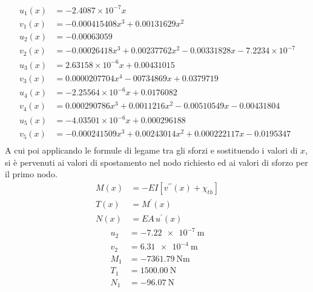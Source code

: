 {\footnotesize{
\begin{align*}
     u_1(x) &= -2.4087\times10^{-7}x\\
     v_1(x) &= -0.000415408 x^3 + 0.00131629 x^2 \\
     u_2(x) &= -0.00063059\\
     v_2(x) &= -0.00026418 x^3 +0.00237762 x^2-0.00331828 x-7.2234\times10^{-7}\\
     u_3(x) &= 2.63158 \times10^{-6}x +0.00431015\\
     v_3(x) &= 0.0000207704 x^4 -00734869x + 0.0379719\\
     u_4(x) &= -2.25564\times10^{-6} x+0.0176082\\
     v_4(x) &= 0.000290786 x^3+0.0011216 x^2-0.00510549 x-0.00431804\\
     u_5(x) &= -4.03501\times10^{-6} x+0.000296188\\
     v_5(x) &= -0.000241509 x^3+0.00243014 x^2 +0.000222117 x-0.0195347\\
\end{align*}}}
A cui poi applicando le formule di legame tra gli sforzi e sostituendo i valori di $x$, si è pervenuti ai valori di spostamento nel nodo richiesto ed ai valori di sforzo per il primo nodo. 
\begin{align*}
    M(x) &= -EI \left[v^{\prime\prime}(x) + \chi_{th}\right] \\
    T(x) &= M^\prime(x) \\
    N(x) &= EA \, u^\prime (x)
\end{align*}
\begin{align*}
    u_2 &= \SI{-7.22e-7}{\meter}\\
    v_2 &= \SI{6.31e-4}{\meter}\\
    M_1 &= \SI{-7361.79}{\newton\meter}\\
    T_1 &= \SI{1500.00}{\newton}\\
    N_1 &= \SI{-96.07}{\newton}\\
\end{align*}

